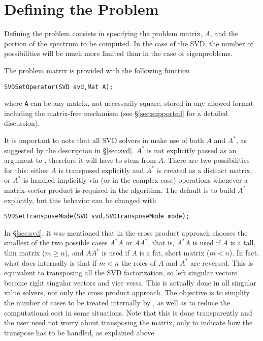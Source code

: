 \section{Defining the Problem}

Defining the problem consists in specifying the problem matrix, $A$, and the portion of the spectrum to be computed. In the case of the SVD, the number of possibilities will be much more limited than in the case of eigenproblems.

The problem matrix is provided with the following function
	\begin{Verbatim}[fontsize=\small]
	SVDSetOperator(SVD svd,Mat A);
	\end{Verbatim}
where \texttt{A} can be any matrix, not necessarily square, stored in any allowed \petsc format including the matrix-free mechanism (see \S\ref{sec:supported} for a detailed discussion).

It is important to note that all SVD solvers in \slepc make use of both $A$ and $A^*$, as suggested by the description in \S\ref{sec:svd}. $A^*$ is not explicitly passed as an argument to , therefore it will have to stem from $A$. There are two possibilities for this: either $A$ is transposed explicitly and $A^*$ is created as a distinct matrix, or $A^*$ is handled implicitly via  (or  in the complex case) operations whenever a matrix-vector product is required in the algorithm. The default is to build $A^*$ explicitly, but this behavior can be changed with 
	\begin{Verbatim}[fontsize=\small]
	SVDSetTransposeMode(SVD svd,SVDTransposeMode mode);
	\end{Verbatim}

In \S\ref{sec:svd}, it was mentioned that in \slepc the cross product approach chooses the smallest of the two possible cases $A^*A$ or $AA^*$, that is, $A^*A$ is used if $A$ is a tall, thin matrix ($m\geq n$), and $AA^*$ is used if $A$ is a fat, short matrix ($m<n$). In fact, what \slepc does internally is that if $m<n$ the roles of $A$ and $A^*$ are reversed. This is equivalent to transposing all the SVD factorization, so left singular vectors become right singular vectors and vice versa. This is actually done in all singular value solvers, not only the cross product approach. The objective is to simplify the number of cases to be treated internally by \slepc, as well as to reduce the computational cost in some situations. Note that this is done transparently and the user need not worry about transposing the matrix, only to indicate how the transpose has to be handled, as explained above.

